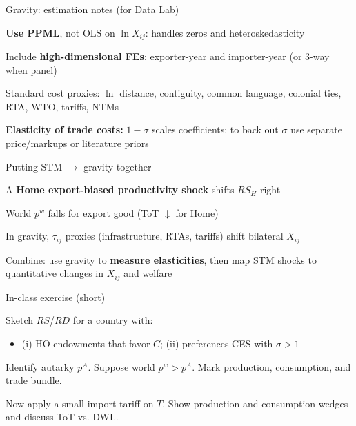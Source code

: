 \documentclass[notes,11pt, aspectratio=169, xcolor=table]{beamer}
\newenvironment{wideitemize}{\itemize\addtolength{\itemsep}{10pt}}{\enditemize}
\begin{document}
\begin{frame}{Gravity: estimation notes (for Data Lab)}
\begin{wideitemize}
  \item \textbf{Use PPML}, not OLS on $\ln X_{ij}$: handles zeros and heteroskedasticity
  \item Include \textbf{high-dimensional FEs}: exporter-year and importer-year (or 3-way when panel)
  \item Standard cost proxies: $\ln$ distance, contiguity, common language, colonial ties, RTA, WTO, tariffs, NTMs
  \item \textbf{Elasticity of trade costs:} $1-\sigma$ scales coefficients; to back out $\sigma$ use separate price/markups or literature priors
\end{wideitemize}
\end{frame}

\begin{frame}{Putting STM $\rightarrow$ gravity together}
\begin{wideitemize}
  \item A \textbf{Home export-biased productivity shock} shifts $RS_H$ right
  \item World $p^w$ falls for export good (ToT $\downarrow$ for Home)
  \item In gravity, $\tau_{ij}$ proxies (infrastructure, RTAs, tariffs) shift bilateral $X_{ij}$
  \item Combine: use gravity to \textbf{measure elasticities}, then map STM shocks to quantitative changes in $X_{ij}$ and welfare
\end{wideitemize}
\end{frame}

\begin{frame}{In-class exercise (short)}
\begin{wideitemize}
  \item Sketch $RS$/$RD$ for a country with:
  \begin{itemize}
    \item (i) HO endowments that favor $C$; (ii) preferences CES with $\sigma>1$
  \end{itemize}
  \item Identify autarky $p^A$. Suppose world $p^w>p^A$. Mark production, consumption, and trade bundle.
  \item Now apply a small import tariff on $T$. Show production and consumption wedges and discuss ToT vs. DWL.
\end{wideitemize}
\end{frame}
\end{document}
